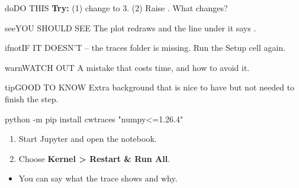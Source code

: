 \documentclass[11pt,letterpaper]{article}
\begin{document}

\begin{guidecallout}{do}{DO THIS}
\textbf{Try:} (1) change  to 3. (2) Raise . What changes?
\end{guidecallout}

\begin{guidecallout}{see}{YOU SHOULD SEE}
The plot redraws and the line under it says .
\end{guidecallout}

\begin{guidecallout}{ifnot}{IF IT DOESN'T}
 -- the traces folder is missing. Run the Setup cell again.
\end{guidecallout}

\begin{guidecallout}{warn}{WATCH OUT}
A mistake that costs time, and how to avoid it.
\end{guidecallout}

\begin{guidecallout}{tip}{GOOD TO KNOW}      %
Extra background that is nice to have but not needed to finish the step.
\end{guidecallout}

\begin{guidecode}
python -m pip install cwtraces "numpy<=1.26.4"
\end{guidecode}

\begin{enumerate}[label=\arabic*.,leftmargin=1.8em,itemsep=2pt,topsep=2pt,parsep=0pt]
\item Start Jupyter and open the notebook.
\item Choose \textbf{Kernel > Restart \& Run All}.     %
\end{enumerate}

\begin{itemize}[leftmargin=1.6em,itemsep=2pt,topsep=2pt,parsep=0pt]
\item You can say what the trace shows and why.
\end{itemize}
\end{document}
